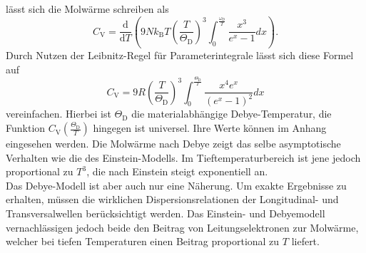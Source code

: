 lässt sich die Molwärme schreiben als
\begin{equation}
  C_{\text{V}} = \frac{\mathrm{d}}{\mathrm{d}T} \left( 9N k_{\text{B}}T \left(\frac{T}{\Theta_{\text{D}}}\right)^3 \int_{0}^{\frac{\omega_{\text{D}}}{T}}\frac{x^3}{e^x-1}dx\right).
\end{equation}
Durch Nutzen der Leibnitz-Regel für Parameterintegrale lässt sich diese Formel auf
\begin{equation}
  C_{\text{V}} = 9R \left(\frac{T}{\Theta_{\text{D}}}\right)^3 \int_{0}^{\frac{\Theta_{\text{D}}}{T}} \frac{x^4e^x}{\left(e^x-1\right)^2}dx
\end{equation}
vereinfachen.
Hierbei ist $\Theta_{\text{D}}$ die materialabhängige Debye-Temperatur, die Funktion $C_{\text{V}}\left(\frac{\Theta_{\text{D}}}{T}\right)$ hingegen ist universel.
Ihre Werte können im Anhang eingesehen werden.
Die Molwärme nach Debye zeigt das selbe asymptotische Verhalten wie die des Einstein-Modells.
Im Tieftemperaturbereich ist jene jedoch proportional zu $T^3$, die nach Einstein steigt exponentiell an.\\
Das Debye-Modell ist aber auch nur eine Näherung.
Um exakte Ergebnisse zu erhalten, müssen die wirklichen Dispersionsrelationen der Longitudinal- und Transversalwellen berücksichtigt werden.
Das Einstein- und Debyemodell vernachlässigen jedoch beide den Beitrag von Leitungselektronen zur Molwärme, welcher bei tiefen Temperaturen einen Beitrag proportional zu $T$ liefert.\cite{skript}
